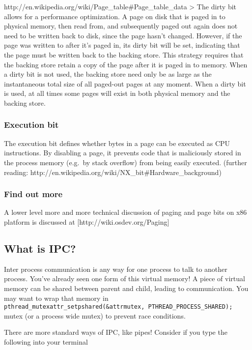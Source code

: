http://en.wikipedia.org/wiki/Page\_table\#Page\_table\_data
\textgreater{} The dirty bit allows for a performance optimization. A
page on disk that is paged in to physical memory, then read from, and
subsequently paged out again does not need to be written back to disk,
since the page hasn't changed. However, if the page was written to after
it's paged in, its dirty bit will be set, indicating that the page must
be written back to the backing store. This strategy requires that the
backing store retain a copy of the page after it is paged in to memory.
When a dirty bit is not used, the backing store need only be as large as
the instantaneous total size of all paged-out pages at any moment. When
a dirty bit is used, at all times some pages will exist in both physical
memory and the backing store.

\subsubsection{Execution bit}\label{execution-bit}

The execution bit defines whether bytes in a page can be executed as CPU
instructions. By disabling a page, it prevents code that is maliciously
stored in the process memory (e.g.~by stack overflow) from being easily
executed. (further reading:
http://en.wikipedia.org/wiki/NX\_bit\#Hardware\_background)

\subsubsection{Find out more}\label{find-out-more}

A lower level more and more technical discussion of paging and page bits
on x86 platform is discussed at {[}http://wiki.osdev.org/Paging{]}

\subsection{What is IPC?}\label{what-is-ipc}

Inter process communication is any way for one process to talk to
another process. You've already seen one form of this virtual memory! A
piece of virtual memory can be shared between parent and child, leading
to communication. You may want to wrap that memory in
\texttt{pthread\_mutexattr\_setpshared(\&attrmutex,\ PTHREAD\_PROCESS\_SHARED);}
mutex (or a process wide mutex) to prevent race conditions.

There are more standard ways of IPC, like pipes! Consider if you type
the following into your terminal

